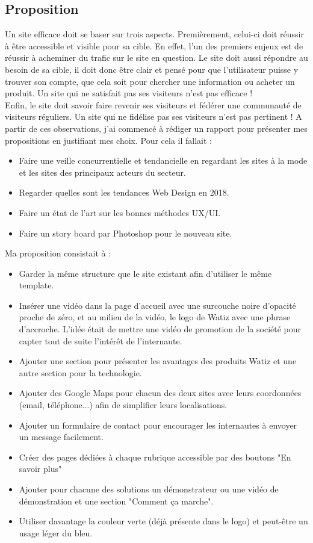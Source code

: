 \documentclass[a4paper, 12pt]{report}
\begin{document}
\subsection{Proposition}
Un site efficace doit se baser sur trois aspects. Premièrement, celui-ci doit réussir à être accessible et visible pour sa cible. En effet, l’un des premiers enjeux est de réussir à acheminer du trafic sur le site en question. 
Le site doit aussi répondre au besoin de sa cible, il doit donc être clair et pensé pour que l’utilisateur puisse y trouver son compte, que cela soit pour chercher une information ou acheter un produit. Un site qui ne satisfait pas ses visiteurs n’est pas efficace !\\
Enfin, le site doit savoir faire revenir ses visiteurs et fédérer une communauté de visiteurs réguliers. Un site qui ne fidélise pas ses visiteurs n’est pas pertinent !
A partir de ces observations, j'ai commencé à rédiger un rapport pour présenter mes propositions en justifiant mes choix. Pour cela il fallait :
\begin{itemize}
\item \textbf{}Faire une veille concurrentielle et tendancielle en regardant les sites à la mode et les sites des principaux acteurs du secteur.
\item \textbf{}Regarder quelles sont les tendances Web Design en 2018.
\item \textbf{}Faire un état de l'art sur les bonnes méthodes UX/UI.
\item \textbf{}Faire un story board par Photoshop pour le nouveau site.\\
\end{itemize} 
Ma proposition consistait à :
\begin{itemize}
\item \textbf{}Garder la même structure que le site existant afin d'utiliser le même template.
\item \textbf{}Insérer une vidéo dans la page d'accueil avec une surcouche noire d'opacité proche de zéro, et au milieu de la vidéo, le logo de Watiz avec une phrase d’accroche. L'idée était de mettre une vidéo de promotion de la société pour capter tout de suite l'intérêt de l'internaute.
\item \textbf{}Ajouter une section pour présenter les avantages des produits Watiz et une autre section pour la technologie.
\item \textbf{}Ajouter des Google Maps pour chacun des deux sites avec leurs coordonnées (email, téléphone...) afin de simplifier leurs localisations.
\item \textbf{}Ajouter un  formulaire de contact pour encourager les internautes à envoyer un message facilement.
\item \textbf{}Créer des pages dédiées à chaque rubrique accessible par des boutons "En savoir plus" 
\item \textbf{}Ajouter pour chacune des solutions un démonstrateur ou une vidéo de démonstration et une section "Comment ça marche".
\item \textbf{}Utiliser davantage la couleur verte (déjà présente dans le logo) et peut-être un usage léger du bleu.  
\end{itemize} 
\end{document}

